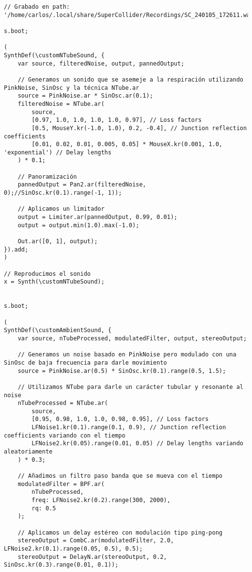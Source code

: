 \begin{minipage}[t]{1\textwidth}
    \centering
    \begin{lstlisting}[style=SuperCollider-IDE, basicstyle=\footnotesize\ttfamily, numbers=none]
// Grabado en path: '/home/carlos/.local/share/SuperCollider/Recordings/SC_240105_172611.wav'

s.boot;

(
SynthDef(\customNTubeSound, {
    var source, filteredNoise, output, pannedOutput;

    // Generamos un sonido que se asemeje a la respiración utilizando PinkNoise, SinOsc y la técnica NTube.ar
    source = PinkNoise.ar * SinOsc.ar(0.1);
    filteredNoise = NTube.ar(
        source,
        [0.97, 1.0, 1.0, 1.0, 1.0, 0.97], // Loss factors
        [0.5, MouseY.kr(-1.0, 1.0), 0.2, -0.4], // Junction reflection coefficients
        [0.01, 0.02, 0.01, 0.005, 0.05] * MouseX.kr(0.001, 1.0, 'exponential') // Delay lengths
    ) * 0.1;

    // Panoramización
    pannedOutput = Pan2.ar(filteredNoise, 0);//SinOsc.kr(0.1).range(-1, 1));

    // Aplicamos un limitador
    output = Limiter.ar(pannedOutput, 0.99, 0.01);
    output = output.min(1.0).max(-1.0);

    Out.ar([0, 1], output);
}).add;
)

// Reproducimos el sonido
x = Synth(\customNTubeSound);


s.boot;

(
SynthDef(\customAmbientSound, {
    var source, nTubeProcessed, modulatedFilter, output, stereoOutput;

    // Generamos un noise basado en PinkNoise pero modulado con una SinOsc de baja frecuencia para darle movimiento
    source = PinkNoise.ar(0.5) * SinOsc.kr(0.1).range(0.5, 1.5);

    // Utilizamos NTube para darle un carácter tubular y resonante al noise
    nTubeProcessed = NTube.ar(
        source,
        [0.95, 0.98, 1.0, 1.0, 0.98, 0.95], // Loss factors
        LFNoise1.kr(0.1).range(0.1, 0.9), // Junction reflection coefficients variando con el tiempo
        LFNoise2.kr(0.05).range(0.01, 0.05) // Delay lengths variando aleatoriamente
    ) * 0.3;

    // Añadimos un filtro paso banda que se mueva con el tiempo
    modulatedFilter = BPF.ar(
        nTubeProcessed,
        freq: LFNoise2.kr(0.2).range(300, 2000),
        rq: 0.5
    );

    // Aplicamos un delay estéreo con modulación tipo ping-pong
    stereoOutput = CombC.ar(modulatedFilter, 2.0, LFNoise2.kr(0.1).range(0.05, 0.5), 0.5);
    stereoOutput = DelayN.ar(stereoOutput, 0.2, SinOsc.kr(0.3).range(0.01, 0.1));


\end{lstlisting}
\end{minipage}
